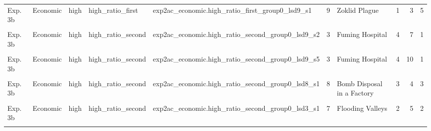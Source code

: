 \documentclass[
]{article}
\begin{document}
\begin{longtable}[t]{lllllrlrrr}
Exp. 3b & Economic & high & high\_ratio\_first & exp2ac\_economic.high\_ratio\_first\_group0\_lsd9\_s1 & 9 & Zoklid Plague & 1 & 3 & 5\\
\addlinespace
\cellcolor{gray!10}{Exp. 3b} & \cellcolor{gray!10}{Economic} & \cellcolor{gray!10}{high} & \cellcolor{gray!10}{high\_ratio\_second} & \cellcolor{gray!10}{exp2ac\_economic.high\_ratio\_second\_group0\_lsd12\_s2} & \cellcolor{gray!10}{3} & \cellcolor{gray!10}{Fuming Hospital} & \cellcolor{gray!10}{4} & \cellcolor{gray!10}{10} & \cellcolor{gray!10}{1}\\
Exp. 3b & Economic & high & high\_ratio\_second & exp2ac\_economic.high\_ratio\_second\_group0\_lsd9\_s2 & 3 & Fuming Hospital & 4 & 7 & 1\\
\cellcolor{gray!10}{Exp. 3b} & \cellcolor{gray!10}{Economic} & \cellcolor{gray!10}{high} & \cellcolor{gray!10}{high\_ratio\_second} & \cellcolor{gray!10}{exp2ac\_economic.high\_ratio\_second\_group0\_lsd9\_s4} & \cellcolor{gray!10}{3} & \cellcolor{gray!10}{Fuming Hospital} & \cellcolor{gray!10}{4} & \cellcolor{gray!10}{2} & \cellcolor{gray!10}{1}\\
Exp. 3b & Economic & high & high\_ratio\_second & exp2ac\_economic.high\_ratio\_second\_group0\_lsd9\_s5 & 3 & Fuming Hospital & 4 & 10 & 1\\
\cellcolor{gray!10}{Exp. 3b} & \cellcolor{gray!10}{Economic} & \cellcolor{gray!10}{high} & \cellcolor{gray!10}{high\_ratio\_second} & \cellcolor{gray!10}{exp2ac\_economic.high\_ratio\_second\_group0\_lsd2\_s3} & \cellcolor{gray!10}{8} & \cellcolor{gray!10}{Bomb Disposal in a Factory} & \cellcolor{gray!10}{3} & \cellcolor{gray!10}{5} & \cellcolor{gray!10}{1}\\
\addlinespace
Exp. 3b & Economic & high & high\_ratio\_second & exp2ac\_economic.high\_ratio\_second\_group0\_lsd8\_s1 & 8 & Bomb Disposal in a Factory & 3 & 4 & 3\\
\cellcolor{gray!10}{Exp. 3b} & \cellcolor{gray!10}{Economic} & \cellcolor{gray!10}{high} & \cellcolor{gray!10}{high\_ratio\_second} & \cellcolor{gray!10}{exp2ac\_economic.high\_ratio\_second\_group0\_lsd8\_s3} & \cellcolor{gray!10}{8} & \cellcolor{gray!10}{Bomb Disposal in a Factory} & \cellcolor{gray!10}{3} & \cellcolor{gray!10}{1} & \cellcolor{gray!10}{4}\\
Exp. 3b & Economic & high & high\_ratio\_second & exp2ac\_economic.high\_ratio\_second\_group0\_lsd3\_s1 & 7 & Flooding Valleys & 2 & 5 & 2\\
\cellcolor{gray!10}{Exp. 3b} & \cellcolor{gray!10}{Economic} & \cellcolor{gray!10}{high} & \cellcolor{gray!10}{high\_ratio\_second} & \cellcolor{gray!10}{exp2ac\_economic.high\_ratio\_second\_group0\_lsd3\_s4} & \cellcolor{gray!10}{7} & \cellcolor{gray!10}{Flooding Valleys} & \cellcolor{gray!10}{2} & \cellcolor{gray!10}{5} & \cellcolor{gray!10}{2}\\

\end{longtable}
\end{document}
